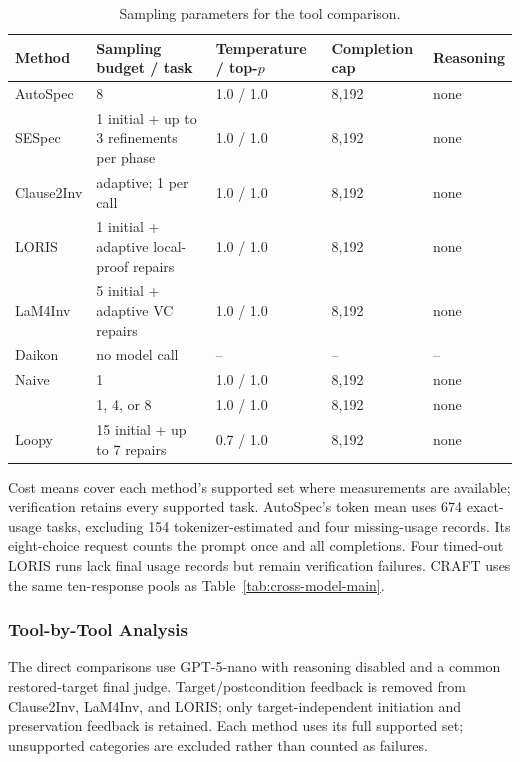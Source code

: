 \begin{table}[H]
\centering
\caption{Sampling parameters for the tool comparison.}
\label{tab:tool-sampling-parameters}
\begin{tabular}{lllll}
\toprule
\rowcolor{algobg}
Method & Sampling budget / task & Temperature / top-\(p\) & Completion cap & Reasoning \\
\midrule
AutoSpec & 8 & 1.0 / 1.0 & 8,192 & none \\
SESpec & 1 initial + up to 3 refinements per phase & 1.0 / 1.0 & 8,192 & none \\
Clause2Inv & adaptive; 1 per call & 1.0 / 1.0 & 8,192 & none \\
LORIS & 1 initial + adaptive local-proof repairs & 1.0 / 1.0 & 8,192 & none \\
LaM4Inv & 5 initial + adaptive VC repairs & 1.0 / 1.0 & 8,192 & none \\
Daikon & no model call & -- & -- & -- \\
Naive & 1 & 1.0 / 1.0 & 8,192 & none \\
\sam{} & 1, 4, or 8 & 1.0 / 1.0 & 8,192 & none \\
Loopy & 15 initial + up to 7 repairs & 0.7 / 1.0 & 8,192 & none \\
\bottomrule
\end{tabular}
\end{table}

Cost means cover each method's supported set where measurements are available;
verification retains every supported task. AutoSpec's token mean uses 674
exact-usage tasks, excluding 154 tokenizer-estimated and four missing-usage
records. Its eight-choice request counts the prompt once and all completions.
Four timed-out LORIS runs lack final usage records but remain verification
failures. CRAFT uses the same ten-response pools as
Table~\ref{tab:cross-model-main}.

\subsubsection{Tool-by-Tool Analysis}

The direct comparisons use GPT-5-nano with reasoning disabled and a common
restored-target final judge. Target/postcondition feedback is removed from
Clause2Inv, LaM4Inv, and LORIS; only target-independent initiation and
preservation feedback is retained. Each method uses its full supported
set; unsupported categories are excluded rather than counted as failures.

